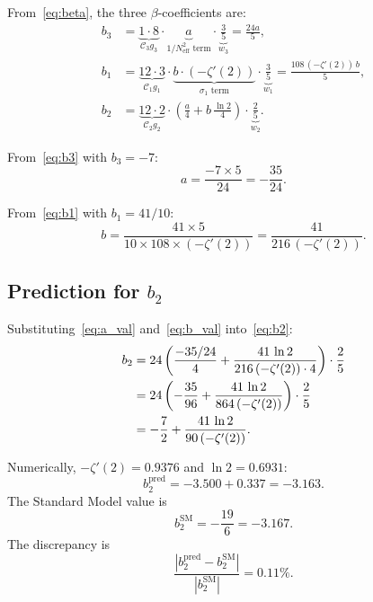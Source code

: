 \documentclass[12pt]{article}
\theoremstyle{definition}
\theoremstyle{remark}
\newcommand{\Neff}{N_{\mathrm{eff}}}
\begin{document}
From~\eqref{eq:beta}, the three $\beta$-coefficients are:
\begin{align}
  b_3 &= \underbrace{1 \cdot 8}_{\mathcal{C}_3 g_3}
    \cdot \underbrace{a}_{1/\Neff^2 \text{ term}}
    \cdot \underbrace{\tfrac{3}{5}}_{w_3}
  = \frac{24a}{5},
  \label{eq:b3}\\[4pt]
  b_1 &= \underbrace{12 \cdot 3}_{\mathcal{C}_1 g_1}
    \cdot \underbrace{b \cdot (-\zeta'(2))}_{\sigma_1 \text{ term}}
    \cdot \underbrace{\tfrac{3}{5}}_{w_1}
  = \frac{108\,(-\zeta'(2))\,b}{5},
  \label{eq:b1}\\[4pt]
  b_2 &= \underbrace{12 \cdot 2}_{\mathcal{C}_2 g_2}
    \cdot \left(\frac{a}{4} + b\,\frac{\ln 2}{4}\right)
    \cdot \underbrace{\tfrac{2}{5}}_{w_2}.
  \label{eq:b2}
\end{align}

From~\eqref{eq:b3} with $b_3 = -7$:
\begin{equation}
  a = \frac{-7 \times 5}{24} = -\frac{35}{24}.
  \label{eq:a_val}
\end{equation}

From~\eqref{eq:b1} with $b_1 = 41/10$:
\begin{equation}
  b = \frac{41 \times 5}{10 \times 108 \times (-\zeta'(2))}
  = \frac{41}{216\,(-\zeta'(2))}.
  \label{eq:b_val}
\end{equation}

\subsection{Prediction for $b_2$}

Substituting~\eqref{eq:a_val} and~\eqref{eq:b_val}
into~\eqref{eq:b2}:
\begin{align}
  b_2 &= 24 \left(\frac{-35/24}{4}
  + \frac{41\,\ln 2}{216\,(-\zeta'(2)) \cdot 4}\right)
  \cdot \frac{2}{5} \notag\\
  &= 24 \left(-\frac{35}{96}
  + \frac{41\,\ln 2}{864\,(-\zeta'(2))}\right)
  \cdot \frac{2}{5} \notag\\
  &= -\frac{7}{2}
  + \frac{41\,\ln 2}{90\,(-\zeta'(2))}.
  \label{eq:b2_pred}
\end{align}

Numerically, $-\zeta'(2) = 0.9376$ and $\ln 2 = 0.6931$:
\begin{equation}
  b_2^{\mathrm{pred}} = -3.500 + 0.337 = -3.163.
\end{equation}
The Standard Model value is
\begin{equation}
  b_2^{\mathrm{SM}} = -\frac{19}{6} = -3.167.
\end{equation}
The discrepancy is
\begin{equation}
  \boxed{\frac{|b_2^{\mathrm{pred}} - b_2^{\mathrm{SM}}|}
  {|b_2^{\mathrm{SM}}|} = 0.11\%.}
\end{equation}
\end{document}
